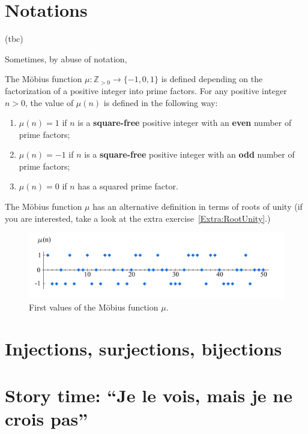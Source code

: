 \documentclass[
	fontsize=10pt, %
	twoside=true, %
	secnumdepth=1, %
	numbers=noenddot, %
]{kaobook}
\begin{document}
\section{Notations}

(tbc)

Sometimes, by abuse of notation,

\begin{example}
The Möbius function $\mu:\mathbb{Z}_{>0}\to\{-1,0,1\}$ is defined depending on the factorization of a positive integer into prime factors. For any positive integer $n>0$, the value of $\mu(n)$ is defined in the following way:
\begin{enumerate}
	\item $\mu(n)=1$ if $n$ is a \textbf{square-free} positive integer with an \textbf{even} number of prime factors;
	\item $\mu(n)=-1$ if $n$ is a \textbf{square-free} positive integer with an \textbf{odd} number of prime factors;
	\item $\mu(n)=0$ if $n$ has a squared prime factor.
\end{enumerate}
The Möbius function $\mu$ has an alternative definition in terms of roots of unity (if you are interested, take a look at the extra exercise~\ref{Extra:RootUnity}.)
\end{example}

\begin{figure}[h]
  \includegraphics{Moebius_mu.png}
  \caption{First values of the Möbius function $\mu$.}
  \label{fig:MobiusMu}
\end{figure}

\section{Injections, surjections, bijections}

\section{Story time: ``Je le vois, mais je ne crois pas''}
\end{document}
